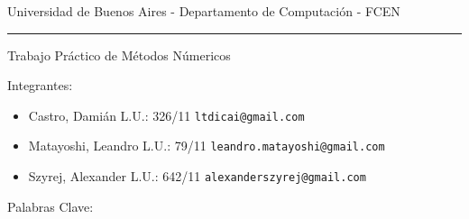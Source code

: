 \begin{center}
	Universidad de Buenos Aires - Departamento de Computaci\'on - FCEN
\end{center}

\rule{\linewidth}{0.5mm}

\vspace{1cm}

\begin{center}
	\Huge{Trabajo Práctico de Métodos Númericos}
\end{center}


\vspace{4cm}


Integrantes:
\begin{itemize}
	\item Castro, Dami\'an L.U.: 326/11  \verb+ltdicai@gmail.com+
	\item Matayoshi, Leandro L.U.: 79/11 \verb+leandro.matayoshi@gmail.com+
	\item Szyrej, Alexander L.U.: 642/11   \verb+alexanderszyrej@gmail.com+
	
\end{itemize}


\maketitle

\vspace{4cm}

Palabras Clave:
	

